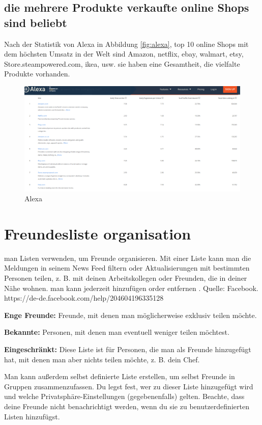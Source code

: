 \subsection{die mehrere Produkte verkaufte online Shops sind beliebt}

Nach der Statistik von Alexa in Abbildung \vref{fig:alexa}, top 10 online Shops mit dem höchsten Umsatz in der Welt sind Amazon, netflix, ebay, walmart, etsy, Store.steampowered.com, ikea, usw. sie haben eine Gesamtheit, die vielfalte  Produkte vorhanden.

\begin{figure}
	\centering
	\includegraphics[width=1\textwidth]{bilder/alexa.png}
	\caption{Alexa}
	\label{fig:alexa}
\end{figure}


\section{Freundesliste organisation}

man Listen verwenden, um  Freunde organisieren. Mit einer Liste kann man die Meldungen in seinem News Feed filtern oder Aktualisierungen mit bestimmten Personen teilen, z. B. mit deinen Arbeitskollegen oder Freunden, die in deiner Nähe wohnen. man kann jederzeit hinzufügen order entfernen .  Quelle: Facebook. https://de-de.facebook.com/help/204604196335128

\textbf{Enge Freunde:} Freunde, mit denen man möglicherweise exklusiv teilen möchte.

\textbf{Bekannte:} Personen, mit denen man eventuell weniger teilen möchtest.

\textbf{Eingeschränkt:} Diese Liste ist für Personen, die man als Freunde hinzugefügt hat, mit denen man aber nichts teilen möchte, z. B. dein Chef.

Man kann außerdem selbst definierte Liste erstellen,  um selbst Freunde in Gruppen zusammenzufassen. Du legst fest, wer zu dieser Liste hinzugefügt wird und welche Privatsphäre-Einstellungen (gegebenenfalls) gelten. Beachte, dass deine Freunde nicht benachrichtigt werden, wenn du sie zu benutzerdefinierten Listen hinzufügst.


